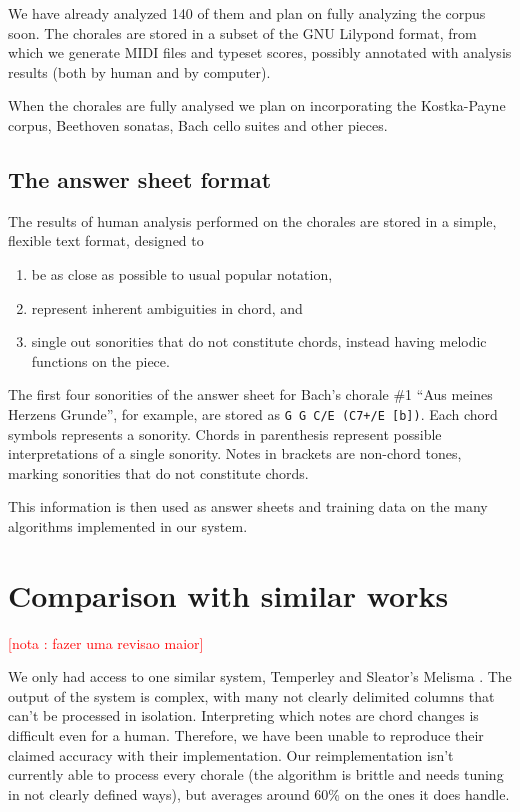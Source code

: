 \documentclass{article}
\newcounter{notacounter}
\newcommand{\nota}[1]{
  \addtocounter{notacounter}{1}
  \textcolor{red}{[nota \arabic{notacounter}: #1]}
}
\begin{document}
We have already analyzed 140 of them and plan on fully analyzing the
corpus soon. The chorales are stored in a subset of the GNU Lilypond
\cite{nienhuys:lilypond} format, from which we generate MIDI files and
typeset scores, possibly annotated with analysis results (both by
human and by computer).

When the chorales are fully analysed we plan on incorporating the
Kostka-Payne \cite{kostka03:tonal} corpus, Beethoven sonatas, Bach
cello suites and other pieces.

\subsection{The answer sheet format}
\label{sec:formato-dos-acordes}

The results of human analysis performed on the chorales are stored in
a simple, flexible text format, designed to

\begin{enumerate}
\item be as close as possible to usual popular notation,
\item represent inherent ambiguities in chord, and
\item single out sonorities that do not constitute chords, instead
  having melodic functions on the piece.
\end{enumerate}

The first four sonorities of the answer sheet for Bach's chorale \#1
``Aus meines Herzens Grunde'', for example, are stored as \texttt{G G
  C/E (C7+/E [b])}. Each chord symbols represents a sonority. Chords
in parenthesis represent possible interpretations of a single
sonority. Notes in brackets are non-chord tones, marking sonorities
that do not constitute chords.

This information is then used as answer sheets and training data on the
many algorithms implemented in our system.

\section{Comparison with similar works}
\label{sec:differences-from-similar-software}

\nota{fazer uma revisao maior}

We only had access to one similar system, Temperley and Sleator's
Melisma \cite{temperley99:modeling}. The output of the system is
complex, with many not clearly delimited columns that can't be
processed in isolation. Interpreting which notes are chord changes is
difficult even for a human. Therefore, we have been unable to
reproduce their claimed accuracy with their implementation. Our
reimplementation isn't currently able to process every chorale (the
algorithm is brittle and needs tuning in not clearly defined ways),
but averages around 60\% on the ones it does handle.
\end{document}
